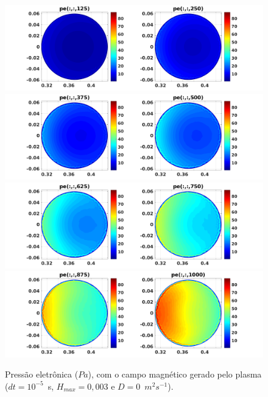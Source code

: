 \documentclass[12pt,oneside,a4paper]{abntex2}
\begin{document}
\begin{figure}[H]
\centering
\includegraphics[scale=0.5]{../SImulacao_breakdown/PDE/petod1B3.png}  
\includegraphics[scale=0.5]{../SImulacao_breakdown/PDE/petod2B3.png} 
\includegraphics[scale=0.5]{../SImulacao_breakdown/PDE/petod3B3.png} 
\includegraphics[scale=0.5]{../SImulacao_breakdown/PDE/petod4B3.png} 
\caption{Pressão eletrônica ($Pa$), com o campo magnético gerado pelo plasma ($dt=10^{-5}$\ s, $H_{max} = 0,003$ e $D=0$\ $m^2s^{-1}$).}
\label{campplasmasil3}
\end{figure}
\end{document}
